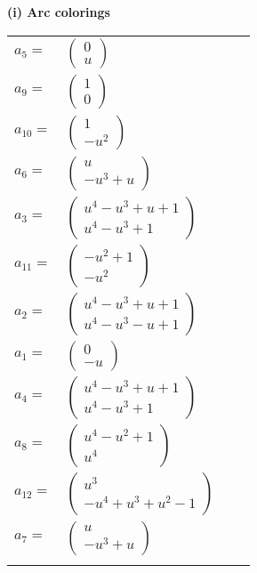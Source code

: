 \documentclass[1p]{elsarticle_modified}
\theoremstyle{definition}
\begin{document}
\flushleft \textbf{(i) Arc colorings}\\
\begin{tabular}{m{7pt} m{180pt} m{7pt} m{180pt} }
\flushright $a_{5}=$&$\begin{pmatrix}0\\u\end{pmatrix}$ \\
\flushright $a_{9}=$&$\begin{pmatrix}1\\0\end{pmatrix}$ \\
\flushright $a_{10}=$&$\begin{pmatrix}1\\- u^2\end{pmatrix}$ \\
\flushright $a_{6}=$&$\begin{pmatrix}u\\- u^3+u\end{pmatrix}$ \\
\flushright $a_{3}=$&$\begin{pmatrix}u^4- u^3+u+1\\u^4- u^3+1\end{pmatrix}$ \\
\flushright $a_{11}=$&$\begin{pmatrix}- u^2+1\\- u^2\end{pmatrix}$ \\
\flushright $a_{2}=$&$\begin{pmatrix}u^4- u^3+u+1\\u^4- u^3- u+1\end{pmatrix}$ \\
\flushright $a_{1}=$&$\begin{pmatrix}0\\- u\end{pmatrix}$ \\
\flushright $a_{4}=$&$\begin{pmatrix}u^4- u^3+u+1\\u^4- u^3+1\end{pmatrix}$ \\
\flushright $a_{8}=$&$\begin{pmatrix}u^4- u^2+1\\u^4\end{pmatrix}$ \\
\flushright $a_{12}=$&$\begin{pmatrix}u^3\\- u^4+u^3+u^2-1\end{pmatrix}$ \\
\flushright $a_{7}=$&$\begin{pmatrix}u\\- u^3+u\end{pmatrix}$\\&\end{tabular}
\end{document}
